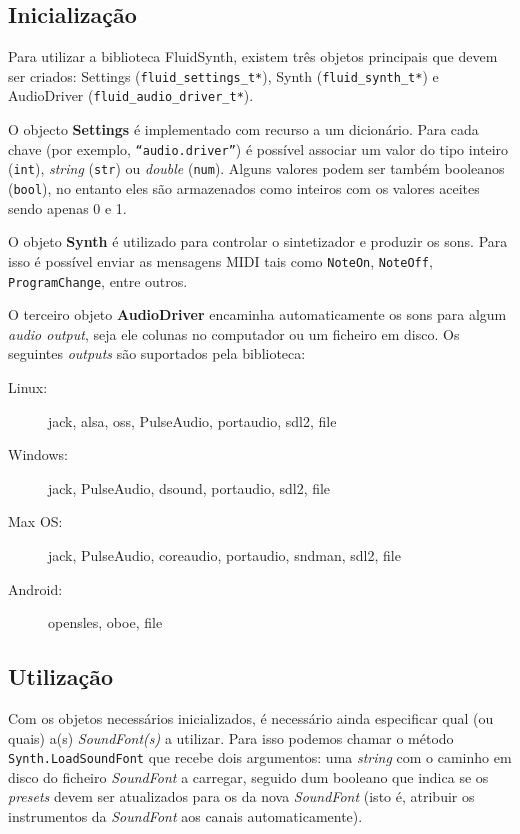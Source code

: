 \documentclass[
  oneside,
  11pt, a4paper,
  footinclude=true,
  headinclude=true,
  cleardoublepage=empty
]{scrbook}
\begin{document}
\subsection{Inicialização}
Para utilizar a biblioteca FluidSynth, existem três objetos principais que devem ser criados: Settings (\texttt{fluid\_settings\_t*}), Synth (\texttt{fluid\_synth\_t*}) e AudioDriver (\texttt{fluid\_audio\_driver\_t*}).

O objecto \textbf{Settings}\cite{fluidsynth_settings} é implementado com recurso a um dicionário. Para cada chave (por exemplo, \texttt{``audio.driver''}) é possível associar um valor do tipo inteiro (\texttt{int}), \textit{string} (\texttt{str}) ou \textit{double} (\texttt{num}). Alguns valores podem ser também booleanos (\texttt{bool}), no entanto eles são armazenados como inteiros com os valores aceites sendo apenas 0 e 1.

O objeto \textbf{Synth} é utilizado para controlar o sintetizador e produzir os sons. Para isso é possível enviar as mensagens MIDI tais como \texttt{NoteOn}, \texttt{NoteOff}, \texttt{ProgramChange}, entre outros.

O terceiro objeto \textbf{AudioDriver} encaminha automaticamente os sons para algum \textit{audio output}, seja ele colunas no computador ou um ficheiro em disco. Os seguintes \textit{outputs} são suportados pela biblioteca:

\begin{adjustwidth}{20pt}{20pt}
\begin{description}
    \item[Linux:] jack, alsa, oss, PulseAudio, portaudio, sdl2, file
    \item[Windows:] jack, PulseAudio, dsound, portaudio, sdl2, file
    \item[Max OS:] jack, PulseAudio, coreaudio, portaudio, sndman, sdl2, file
    \item[Android:] opensles, oboe, file
\end{description}
\end{adjustwidth}

\subsection{Utilização}
Com os objetos necessários inicializados, é necessário ainda especificar qual (ou quais) a(s) \textit{SoundFont(s)} a utilizar. Para isso podemos chamar o método \texttt{Synth.LoadSoundFont} que recebe dois argumentos: uma \textit{string} com o caminho em disco do ficheiro \textit{SoundFont} a carregar, seguido dum booleano que indica se os \textit{presets} devem ser atualizados para os da nova \textit{SoundFont} (isto é, atribuir os instrumentos da \textit{SoundFont} aos canais automaticamente).
\end{document}
